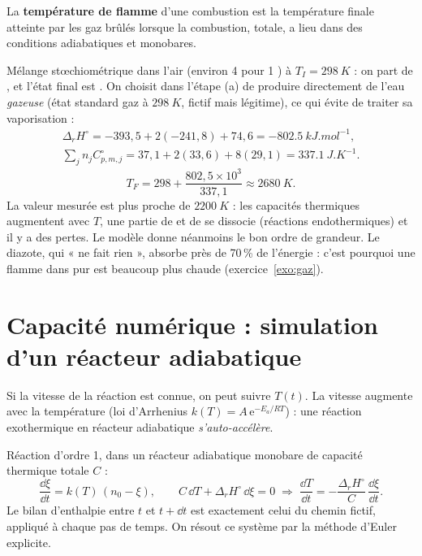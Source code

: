 \begin{definition}
La \textbf{température de flamme} d'une combustion est la température finale atteinte par les gaz brûlés lorsque la combustion, totale, a lieu dans des conditions adiabatiques et monobares.
\end{definition}

\begin{exemple}
Mélange stœchiométrique dans l'air (environ 4  pour 1 ) à $T_I = \SI{298}{K}$ : on part de , et l'état final est . On choisit dans l'étape (a) de produire directement de l'eau \emph{gazeuse} (état standard gaz à $\SI{298}{K}$, fictif mais légitime), ce qui évite de traiter sa vaporisation :
\begin{gather*} \Delta_rH^\circ = -393{,}5 + 2(-241{,}8) + 74{,}6 = \SI{-802,5}{kJ.mol^{-1}},\\ \sum_jn_jC^\circ_{p,m,j} = 37{,}1 + 2(33{,}6) + 8(29{,}1) = \SI{337,1}{J.K^{-1}}. \end{gather*}
\[ T_F = 298 + \frac{802{,}5\times10^3}{337{,}1} \approx \SI{2680}{K}. \]
La valeur mesurée est plus proche de $\SI{2200}{K}$ : les capacités thermiques augmentent avec $T$, une partie de  et de  se dissocie (réactions endothermiques) et il y a des pertes. Le modèle donne néanmoins le bon ordre de grandeur. Le diazote, qui « ne fait rien », absorbe près de 70\,\% de l'énergie : c'est pourquoi une flamme dans  pur est beaucoup plus chaude (exercice~\ref{exo:gaz}).
\end{exemple}

\section{Capacité numérique : simulation d'un réacteur adiabatique}

Si la vitesse de la réaction est connue, on peut suivre $T(t)$. La vitesse augmente avec la température (loi d'Arrhenius $k(T) = A\,\mathrm{e}^{-E_a/RT}$) : une réaction exothermique en réacteur adiabatique \emph{s'auto-accélère}.

\begin{numerique}[modèle]
Réaction  d'ordre 1, dans un réacteur adiabatique monobare de capacité thermique totale $C$ :
\[ \frac{\dd\xi}{\dd t} = k(T)\,(n_0-\xi), \qquad C\,\dd T + \Delta_rH^\circ\,\dd\xi = 0 \;\Longrightarrow\; \frac{\dd T}{\dd t} = -\frac{\Delta_rH^\circ}{C}\,\frac{\dd\xi}{\dd t}. \]
Le bilan d'enthalpie entre $t$ et $t+\dd t$ est exactement celui du chemin fictif, appliqué à chaque pas de temps. On résout ce système par la méthode d'Euler explicite.
\end{numerique}

